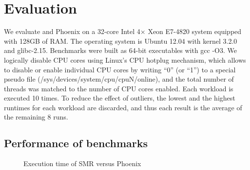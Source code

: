 \section{Evaluation}
We evaluate \myds and Phoenix on 
a 32-core Intel 4× Xeon E7-4820 system equipped with 128GB of RAM. 
The operating system is Ubuntu 12.04 with kernel 3.2.0 and glibc-2.15.
Benchmarks were built as 64-bit executables with gcc -O3.
We logically disable CPU cores using Linux’s CPU hotplug mechanism, 
which allows to disable or enable individual CPU cores 
by writing “0” (or “1”) to 
a special pseudo file (/sys/devices/system/cpu/cpuN/online), 
and the total number of threads was matched to the number of CPU cores enabled.
Each workload is executed 10 times. 
To reduce the effect of outliers, 
the lowest and the highest runtimes for each workload are discarded, 
and thus each result is the average of the remaining 8 runs.

\subsection{Performance of benchmarks}

\begin{figure}[htpb]
\centering
  \caption{Execution time of SMR versus Phoenix}
   \label{fig:time}
\end{figure}

